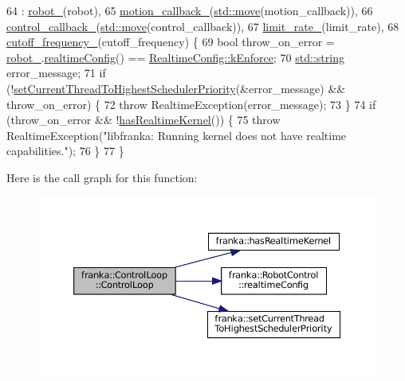\begin{DoxyCode}
64     : \hyperlink{classfranka_1_1ControlLoop_aa618899fdcd85da8659fb3b1bd8c65b3}{robot\_}(robot),
65       \hyperlink{classfranka_1_1ControlLoop_a8304d484624d562c70e3572d5037871b}{motion\_callback\_}(\hyperlink{namespacefranka__gripper_a1356a87108d2229401d3755bd3e53bdf}{std::move}(motion\_callback)),
66       \hyperlink{classfranka_1_1ControlLoop_a71249c690ee56b2c099bbb4f29e92c95}{control\_callback\_}(\hyperlink{namespacefranka__gripper_a1356a87108d2229401d3755bd3e53bdf}{std::move}(control\_callback)),
67       \hyperlink{classfranka_1_1ControlLoop_a660f32d739c7f7ed05fa97b06220b98b}{limit\_rate\_}(limit\_rate),
68       \hyperlink{classfranka_1_1ControlLoop_a1c01098536341d3e1da2617a08129529}{cutoff\_frequency\_}(cutoff\_frequency) \{
69   \textcolor{keywordtype}{bool} throw\_on\_error = \hyperlink{classfranka_1_1ControlLoop_aa618899fdcd85da8659fb3b1bd8c65b3}{robot\_}.\hyperlink{classfranka_1_1RobotControl_aca02c0c27b863d4a42e08d541c400832}{realtimeConfig}() == 
      \hyperlink{namespacefranka_aeede4f4629390fea21ca5e5a35a8a943a024bd586d70db805d622b85815bfa0de}{RealtimeConfig::kEnforce};
70   \hyperlink{namespacetesting_1_1internal_a8e8ff5b11e64078831112677156cb111}{std::string} error\_message;
71   \textcolor{keywordflow}{if} (!\hyperlink{namespacefranka_a5c090196bc50ead82194d3e594e61e65}{setCurrentThreadToHighestSchedulerPriority}(&error\_message)
       && throw\_on\_error) \{
72     \textcolor{keywordflow}{throw} RealtimeException(error\_message);
73   \}
74   \textcolor{keywordflow}{if} (throw\_on\_error && !\hyperlink{namespacefranka_ad165a74da105c78586c0cd4c1ed57bd2}{hasRealtimeKernel}()) \{
75     \textcolor{keywordflow}{throw} RealtimeException(\textcolor{stringliteral}{"libfranka: Running kernel does not have realtime capabilities."});
76   \}
77 \}
\end{DoxyCode}
Here is the call graph for this function\+:
\nopagebreak
\begin{figure}[H]
\begin{center}
\leavevmode
\includegraphics[width=350pt]{classfranka_1_1ControlLoop_aecc26183c892cb2c1d125e5c14486bae_cgraph}
\end{center}
\end{figure}


